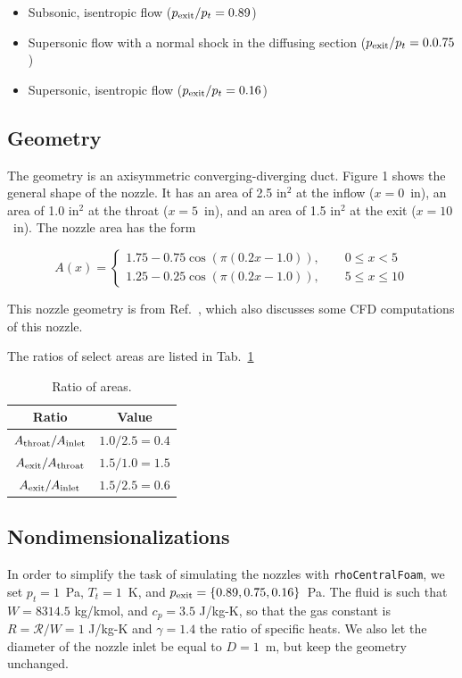 \documentclass[12pt]{article}
\begin{document}
\begin{itemize}
\item Subsonic, isentropic flow ($p_{\rm exit}/p_t=0.89$)
\item Supersonic flow with a normal shock in the diffusing section ($p_{\rm exit}/p_t=0.0.75$)
\item Supersonic, isentropic flow ($p_{\rm exit}/p_t=0.16$)
\end{itemize}


\subsection{Geometry}

The geometry is an axisymmetric converging-diverging duct.
Figure 1 shows the general shape of the nozzle.
It has an area of 2.5 in$^2$ at the inflow ($x = 0$~in), an area of 1.0 in$^2$ at the throat ($x = 5$~in),
and an area of 1.5 in$^2$ at the exit ($x = 10$~in).
The nozzle area has the form

\begin{equation}
A(x) = \left\{
\begin{array}{c}
1.75 - 0.75 \cos( \pi ( 0.2 x - 1.0 ) ), \qquad 0 \le x < 5 \\
1.25 - 0.25 \cos( \pi ( 0.2 x - 1.0 ) ), \qquad 5 \le x \le 10
\end{array}
\right.
\end{equation}

This nozzle geometry is from Ref.~\citep{liou1987}, which also discusses some CFD computations of this nozzle. 

The ratios of select areas are listed in Tab.~\ref{tab:area_ratios}

\begin{table}[ht!]
\centering
\begin{tabular}{cc}
\hline
Ratio & Value  \\
\hline
$A_{\rm throat}/A_{\rm inlet}$ & $1.0/2.5 = 0.4$ \\
$A_{\rm exit}/A_{\rm throat}$ & $1.5/1.0 = 1.5$ \\
$A_{\rm exit}/A_{\rm inlet}$ & $1.5/2.5=0.6$ \\
\hline
\end{tabular}
\caption{Ratio of areas.}
\label{tab:area_ratios}
\end{table}



\subsection{Nondimensionalizations}
In order to simplify the task of simulating the nozzles with \Verb+rhoCentralFoam+, we
set $p_t = 1$~Pa, $T_t=1$~K, and $p_{\rm exit} = \{0.89, 0.75, 0.16\}$~Pa.
The fluid is such that $W = 8314.5$ kg/kmol, and $c_p = 3.5$ J/kg-K,
so that the gas constant is $R=\mathcal{R}/W = 1$ J/kg-K and $\gamma = 1.4$ the ratio of specific heats.
We also let the diameter of the nozzle inlet be equal to $D=1$~m, but keep the geometry
unchanged.
\end{document}
